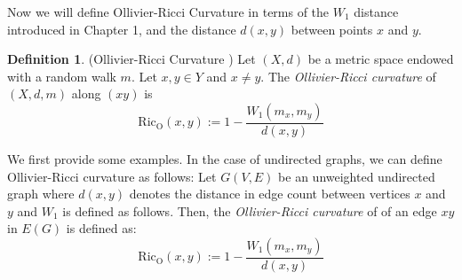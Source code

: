 \documentclass{Dissertate}
\theoremstyle{definition}
\theoremstyle{definition} %
\theoremstyle{definition}
\newtheorem{definition}[theorem]{Definition}
\begin{document}
Now we will define Ollivier-Ricci Curvature in terms of the $W_1$ distance introduced in Chapter 1, and the distance $d(x,y)$ between points $x$ and $y$. 
\\
\begin{definition} (Ollivier-Ricci Curvature \cite{ollivier_ricci_2009}) Let $(X,d)$ be a metric space endowed with a random walk $m$. Let $x,y \in Y$ 
and $x\neq y$. The \textit{Ollivier-Ricci curvature} of $(X,d,m)$ along $(xy)$ is 
\begin{equation}
\operatorname{Ric_O}(x,y) := 1 - \frac{W_1(m_x,m_y)}{d(x,y)}
\end{equation}
\end{definition}
We first provide some examples. 
In the case of undirected graphs, we can define Ollivier-Ricci curvature as follows: 
Let $G(V,E)$ be an unweighted undirected graph where $d(x,y)$ denotes the distance in edge count between vertices $x$ and $y$ and $W_1$ is defined as follows. Then, 
the \textit{Ollivier-Ricci curvature} of of an edge $xy$ in $E(G)$ is defined as: 
\begin{equation}
\operatorname{Ric_O}(x,y) := 1 - \frac{W_1(m_x,m_y)}{d(x,y)}
\end{equation}
\end{document}
